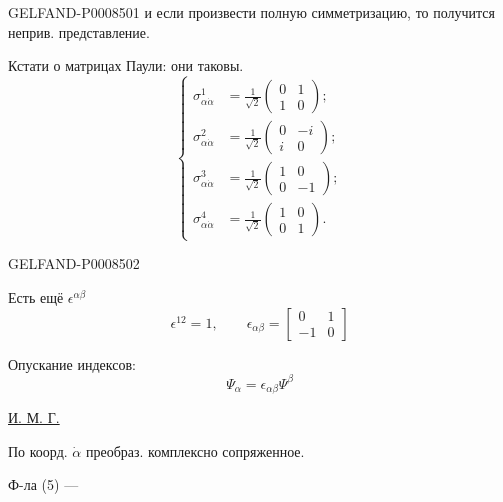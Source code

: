 \begin{GelfandAdjacentEvidence}{GELFAND-P000850}{1}
и если произвести полную симметризацию, то получится неприв. представление.

Кстати о матрицах Паули: они таковы.
\[
\left\{\begin{aligned}
\sigma^1_{\alpha\dot\alpha}&=\frac{1}{\sqrt2}\begin{pmatrix}0&1\\1&0\end{pmatrix};\\
\sigma^2_{\alpha\dot\alpha}&=\frac{1}{\sqrt2}\begin{pmatrix}0&-i\\i&0\end{pmatrix};\\
\sigma^3_{\alpha\dot\alpha}&=\frac{1}{\sqrt2}\begin{pmatrix}1&0\\0&-1\end{pmatrix};\\
\sigma^4_{\alpha\dot\alpha}&=\frac{1}{\sqrt2}\begin{pmatrix}1&0\\0&1\end{pmatrix}.
\end{aligned}\right. \tag{7}
\]
\end{GelfandAdjacentEvidence}
\begin{GelfandAdjacentEvidence}{GELFAND-P000850}{2}


Есть ещё \(\epsilon^{\alpha\beta}\)
\[
\epsilon^{12}=1,\qquad\epsilon_{\alpha\beta}=\begin{bmatrix}0&1\\-1&0\end{bmatrix} \tag{8}
\]

Опускание индексов:
\[
\Psi_\alpha=\epsilon_{\alpha\beta}\Psi^\beta \tag{9}
\]

\uline{И. М. Г.}

По коорд. \(\dot\alpha\) преобраз. комплексно сопряженное.

Ф-ла (5) — 
\end{GelfandAdjacentEvidence}
